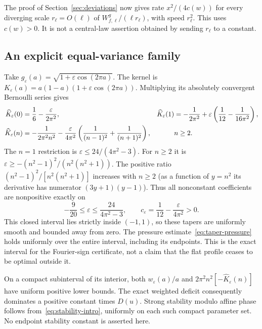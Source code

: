 \documentclass[11pt,reqno]{amsart}
\numberwithin{equation}{section}
\begin{document}
The proof of Section~\ref{sec:deviations} now gives rate
$x^2/(4c(w))$ for every diverging scale $r_\ell=O(\ell)$
of $W_{f,\ell}^g/(\ell r_\ell)$, with speed $r_\ell^2$.
This uses $c(w)>0$. It is not a central-law assertion obtained
by sending $r_\ell$ to a constant.

\subsection*{An explicit equal-variance family}

Take $g_\varepsilon(a)=\sqrt{1+\varepsilon\cos(2\pi a)}$.
The kernel is
$K_\varepsilon(a)=a(1-a)(1+\varepsilon\cos(2\pi a))$.
Multiplying its absolutely convergent Bernoulli series gives
\begin{align}\label{eq:taper-fourier}
 \widehat K_\varepsilon(0)&=\frac16-\frac{\varepsilon}{2\pi^2},
 &\widehat K_\varepsilon(1)&=-\frac1{2\pi^2}
                       +\varepsilon\left(\frac1{12}-\frac1{16\pi^2}\right),
 \notag\\
 \widehat K_\varepsilon(n)&=-\frac1{2\pi^2n^2}
       -\frac{\varepsilon}{4\pi^2}
          \left(\frac1{(n-1)^2}+\frac1{(n+1)^2}\right),&&n\ge2.
\end{align}
The $n=1$ restriction is
$\varepsilon\le24/(4\pi^2-3)$. For $n\ge2$ it is
$\varepsilon\ge-(n^2-1)^2/(n^2(n^2+1))$.
The positive ratio $(n^2-1)^2/[n^2(n^2+1)]$ increases with $n\ge2$
(as a function of $y=n^2$ its derivative has numerator
$(3y+1)(y-1)$). Thus all nonconstant coefficients are
nonpositive exactly on
\begin{equation}\label{eq:taper-range}
 -\frac9{20}\le\varepsilon\le\frac{24}{4\pi^2-3},
 \qquad c_\varepsilon=\frac1{12}-\frac{\varepsilon}{4\pi^2}>0.
\end{equation}
This closed interval lies strictly inside $(-1,1)$, so these
tapers are uniformly smooth and bounded away from zero.
The pressure estimate~\eqref{eq:taper-pressure} holds uniformly
over the entire interval, including its endpoints. This is
the exact interval for the Fourier-sign certificate, not a
claim that the flat profile ceases to be optimal outside it.

On a compact subinterval of its interior, both
$w_\varepsilon(a)/a$ and
$2\pi^2n^2[-\widehat K_\varepsilon(n)]$ have uniform positive
lower bounds. The exact weighted deficit consequently dominates
a positive constant times $D(u)$. Strong stability modulo
affine phase follows from~\eqref{eq:stability-intro}, uniformly
on each such compact parameter set. No endpoint stability
constant is asserted here.
\end{document}
